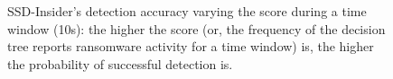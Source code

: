 \documentclass[conference]{IEEEtran}
\newcommand{\ours}{SSD-Insider}
\begin{document}
\begin{figure}[t]
        \caption{\ours{}'s detection accuracy varying the score during a time window (10s):
        the higher the score (or, the frequency of the decision tree reports ransomware activity for a time window) is,
        the higher the probability of successful detection is.}
        \label{fig:accuracy}
\end{figure}
\end{document}
